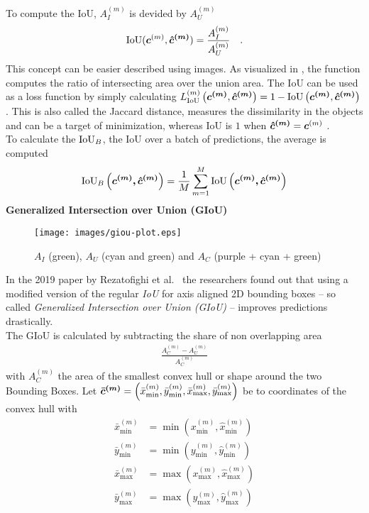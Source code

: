 To compute the IoU, $A^{(m)}_I$ is devided by $A^{(m)}_U$
\begin{align}
    \text{IoU}(\bm{c}^{(m)}, \bm{\hat{c}^{(m)}}) = \frac{A^{(m)}_I}{A^{(m)}_U}\quad .
    \label{eq:iou}
\end{align}
This concept can be easier described using images.
As visualized in , the function computes the ratio of intersecting area over the union area.\newline
The IoU can be used as a loss function by simply calculating $L^{(m)}_{\text{IoU}}\left(\bm{c^{(m)}}, \bm{\hat{c}^{(m)}}\right) = 1 - \text{IoU}\left(\bm{c^{(m)}}, \bm{\hat{c}^{(m)}}\right)$.
This is also called the Jaccard distance, measures the dissimilarity in the objects and can be a target of minimization, whereas IoU is $1$ when $\bm{\hat{c}^{(m)}}=\bm{c}^{(m)}$ .\\
To calculate the $\text{IoU}_B$, the IoU over a batch of predictions, the average is computed
\begin{align}
    \text{IoU}_B\left(
        \bm{c^{(m)},
        \bm{\hat{c}^{(m)}}
    }\right) = \frac{1}{M}
    \sum\limits_{m=1}^M
    \text{IoU}\left(
        \bm{c^{(m)},
        \bm{\hat{c}^{(m)}}
    }\right)
\end{align}
\textbf{Generalized Intersection over Union (GIoU)}\\
\begin{wrapfigure}{r}{0.5\textwidth}
    \centering
    \texttt{[image: images/giou-plot.eps]}
    \caption{$A_I$ (green), $A_U$ (cyan and green) and $A_C$ (purple + cyan + green)}
    \label{fig:giou}
\end{wrapfigure}
In the 2019 paper by Rezatofighi et al.~\cite{GIoU} the researchers found out that using a modified version of the regular \textit{IoU} for axis aligned 2D bounding boxes – so called \textit{Generalized Intersection over Union (GIoU)} – improves predictions drastically.\\
The GIoU is calculated by subtracting the share of non overlapping area
\begin{align}
    \frac{A^{(m)}_C - A^{(m)}_U}{A^{(m)}_C}
\end{align}
with $A^{(m)}_C$ the area of the smallest convex hull or shape around the two Bounding Boxes. Let $\bm{\bar{c}^{(m)}} = \left(\bar{x}^{(m)}_{\min}, \bar{y}^{(m)}_{\min}, \bar{x}^{(m)}_{\max}, \bar{y}^{(m)}_{\max}\right)$ be to coordinates of the convex hull
with
\begin{align*}
    \bar{x}^{(m)}_{\min} &= \min(x^{(m)}_{\min}, \hat{x}^{(m)}_{\min})\\
    \bar{y}^{(m)}_{\min} &= \min(y^{(m)}_{\min}, \hat{y}^{(m)}_{\min})\\
    \bar{x}^{(m)}_{\max} &= \max(x^{(m)}_{\max}, \hat{x}^{(m)}_{\max})\\
    \bar{y}^{(m)}_{\max} &= \max(y^{(m)}_{\max}, \hat{y}^{(m)}_{\max})
\end{align*}
